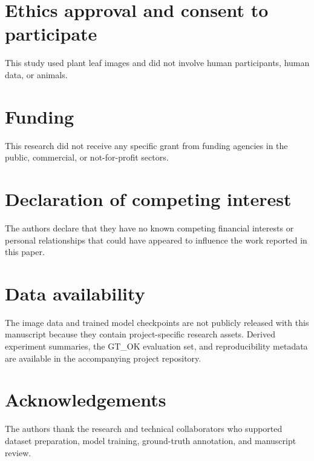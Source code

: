 \documentclass[final,5p,times,twocolumn,authoryear]{elsarticle}
\begin{document}
\section*{Ethics approval and consent to participate}
\noindent This study used plant leaf images and did not involve human participants, human data, or animals.

\section*{Funding}
\noindent This research did not receive any specific grant from funding agencies in the public, commercial, or not-for-profit sectors.

\section*{Declaration of competing interest}
\noindent The authors declare that they have no known competing financial interests or personal relationships that could have appeared to influence the work reported in this paper.

\section*{Data availability}
\noindent The image data and trained model checkpoints are not publicly released with this manuscript because they contain project-specific research assets. Derived experiment summaries, the GT\_OK evaluation set, and reproducibility metadata are available in the accompanying project repository.

\section*{Acknowledgements}
\noindent The authors thank the research and technical collaborators who supported dataset preparation, model training, ground-truth annotation, and manuscript review.
\end{document}
